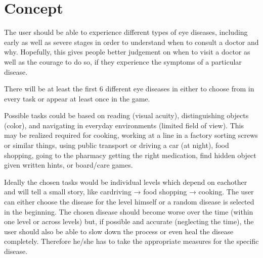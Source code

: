 \documentclass{acm_proc_article-sp}
\begin{document}
\section{Concept}

The user should be able to experience different types of eye diseases,
including early as well as severe stages in order to understand when to consult
a doctor and why. Hopefully, this gives people better judgement on when to
visit a doctor as well as the courage to do so, if they experience the symptoms
of a particular disease.

There will be at least the first 6 different eye diseases in
 either to choose from in every task or appear at least
once in the game.

Possible tasks could be based on reading (visual acuity), distinguishing
objects (color), and navigating in everyday environments
(limited field of view).
This may be realized required for cooking, working at a line in a factory
sorting screws or similar things, using public transport or driving a car
(at night), food shopping, going to the pharmacy getting the right medication,
find hidden object given written hints, or board/care games.

Ideally the chosen tasks would be individual levels which depend on eachother
and will tell a small story, like cardriving → food shopping → cooking.
The user can either choose the disease for the level himself or a random disease
is selected in the beginning.
The chosen disease should become worse over the time (within one level or
across levels) but, if possible and accurate (neglecting the time), the user
should also be able to slow down the process or even heal the disease
completely. Therefore he/she has to take the appropriate measures for the
specific disease.
\end{document}
